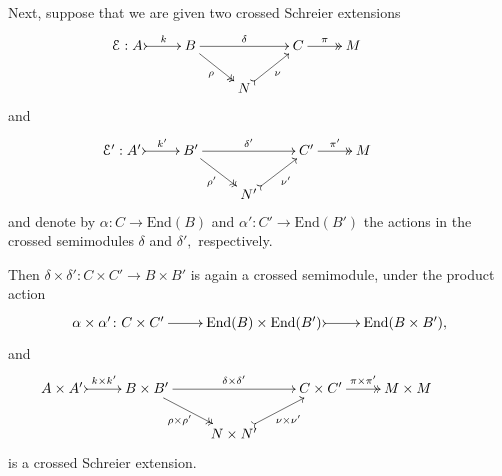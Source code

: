 \documentclass[a4paper]{amsart}
\theoremstyle{plain}
\theoremstyle{definition}
\theoremstyle{remark}
\begin{document}
Next, suppose that we are given two crossed Schreier extensions
\begin{equation*}
\xymatrixrowsep{1.5pc}
\xymatrix{
{\mathcal{E}:A} \ar@{>->}[r]^-k &B \ar@{->>}[rd]_-{\rho} \ar[rr]^-{\delta} & \ &C \ar@{->>}[r]^-{\pi} &{M} \\
 &\ &N \ar@{>->}[ru]_-{\nu}&\ &\ &\
}
\end{equation*}
and
\begin{equation*}
\xymatrixrowsep{1.5pc}
\xymatrix{
{\mathcal{E}':A'} \ar@{>->}[r]^-{k'} &{B'} \ar@{->>}[rd]_-{\rho'} \ar[rr]^-{\delta'} & \ &{C'} \ar@{->>}[r]^-{\pi'} &{M} \\
 &\ &{N'} \ar@{>->}[ru]_-{\nu'}&\ &\ &\
}
\end{equation*}
and denote by $\alpha\colon C\longrightarrow \mathrm{End}(B)$ and  $\alpha'\colon C'\longrightarrow \mathrm{End}(B')$ the actions in the crossed semimodules $\delta$ and $\delta',$ respectively.

Then $\delta\times\delta'\colon C\times C'\longrightarrow B\times B'$ is again a crossed semimodule, under the product action
\begin{equation}
\label{eqn:prodact1}
\xymatrix{ {\alpha\times\alpha'\colon C\times C'} \ar[r] &{\mathrm{End}(B)\times \mathrm{End}(B')} \ar@{>->}[r] &{\mathrm{End}(B\times B'),}}
\end{equation}
and
\begin{equation*}
\xymatrixrowsep{1.5pc}
\xymatrix{
{A\times A'} \ar@{>->}[r]^-{k\times k'} &{B\times B'} \ar@{->>}[rd]_-{\rho\times\rho'} \ar[rr]^-{\delta\times\delta'} & \ &{C\times C'} \ar@{->>}[r]^-{\pi\times \pi'} &{M\times M} \\
 &\ &{N\times N'} \ar@{>->}[ru]_-{\nu\times \nu'}&\ &\ &\
}
\end{equation*}
is a crossed Schreier extension.
\end{document}
